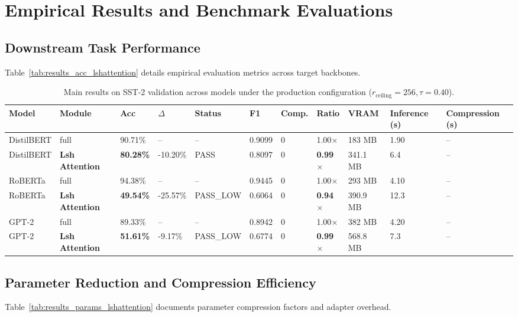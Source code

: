 \section{Empirical Results and Benchmark Evaluations}

\subsection{Downstream Task Performance}
Table~\ref{tab:results_acc_lshattention} details empirical evaluation metrics across target backbones.

\begin{table}[t]
\centering
\small
\begin{tabular}{lllllllllll}
\toprule
\textbf{Model} & \textbf{Module} & \textbf{Acc} & \textbf{$\Delta$} & \textbf{Status} & \textbf{F1} & \textbf{Comp.} & \textbf{Ratio} & \textbf{VRAM} & \textbf{Inference (s)} & \textbf{Compression (s)} \\
\midrule
DistilBERT & full & 90.71\% & -- & -- & 0.9099 & 0 & 1.00$\times$ & 183 MB & 1.90 & -- \\
DistilBERT & \textbf{Lsh Attention} & \textbf{80.28\%} & -10.20\% & PASS & 0.8097 & 0 & \textbf{0.99$\times$} & 341.1 MB & 6.4 & -- \\
RoBERTa & full & 94.38\% & -- & -- & 0.9445 & 0 & 1.00$\times$ & 293 MB & 4.10 & -- \\
RoBERTa & \textbf{Lsh Attention} & \textbf{49.54\%} & -25.57\% & PASS_LOW & 0.6064 & 0 & \textbf{0.94$\times$} & 390.9 MB & 12.3 & -- \\
GPT-2 & full & 89.33\% & -- & -- & 0.8942 & 0 & 1.00$\times$ & 382 MB & 4.20 & -- \\
GPT-2 & \textbf{Lsh Attention} & \textbf{51.61\%} & -9.17\% & PASS_LOW & 0.6774 & 0 & \textbf{0.99$\times$} & 568.8 MB & 7.3 & -- \\
\bottomrule
\end{tabular}
\caption{Main results on SST-2 validation across models under the production configuration ($r_{\mathrm{ceiling}}=256, \tau=0.40$).}
\label{tab:main_sst2}
\end{table}

\subsection{Parameter Reduction and Compression Efficiency}
Table~\ref{tab:results_params_lshattention} documents parameter compression factors and adapter overhead.

